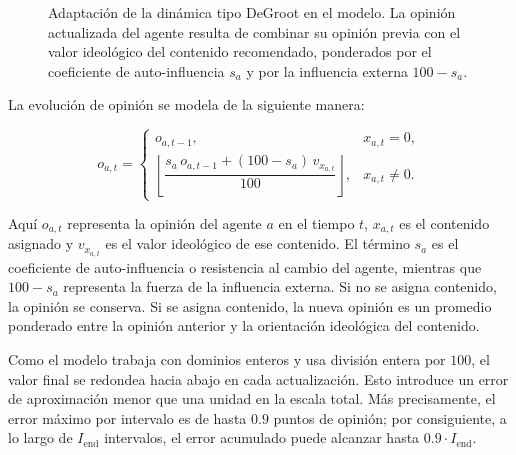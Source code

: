 \documentclass[10pt,letterpaper]{article}
\begin{document}
\begin{figure}[H]
\centering
{}
\caption{Adaptaci\'on de la din\'amica tipo DeGroot en el modelo. La opini\'on actualizada del agente resulta de combinar su opini\'on previa con el valor ideol\'ogico del contenido recomendado, ponderados por el coeficiente de auto-influencia \(s_a\) y por la influencia externa \(100-s_a\).}
\end{figure}

La evoluci\'on de opini\'on se modela de la siguiente manera:

\[
o_{a,t} =
\begin{cases}
o_{a,t-1}, & x_{a,t}=0,\\[6pt]
\left\lfloor
\dfrac{s_a\,o_{a,t-1} + (100-s_a)\,v_{x_{a,t}}}{100}
\right\rfloor, & x_{a,t}\neq 0.
\end{cases}
\]

Aqu\'i \(o_{a,t}\) representa la opini\'on del agente \(a\) en el tiempo \(t\), \(x_{a,t}\) es el contenido asignado y \(v_{x_{a,t}}\) es el valor ideol\'ogico de ese contenido. El t\'ermino \(s_a\) es el coeficiente de auto-influencia o resistencia al cambio del agente, mientras que \(100-s_a\) representa la fuerza de la influencia externa. Si no se asigna contenido, la opini\'on se conserva. Si se asigna contenido, la nueva opini\'on es un promedio ponderado entre la opini\'on anterior y la orientaci\'on ideol\'ogica del contenido. 

Como el modelo trabaja con dominios enteros y usa divisi\'on entera por \(100\), el valor final se redondea hacia abajo en cada actualizaci\'on. Esto introduce un error de aproximaci\'on menor que una unidad en la escala total. M\'as precisamente, el error m\'aximo por intervalo es de hasta \(0.9\) puntos de opini\'on; por consiguiente, a lo largo de \(I_{\text{end}}\) intervalos, el error acumulado puede alcanzar hasta \(0.9 \cdot I_{\text{end}}\).
\end{document}
